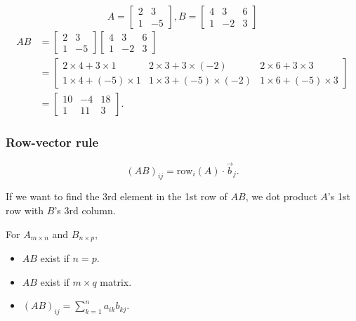 \documentclass{article}
\begin{document}
\begin{example}[Compute AB]
    \[
        A =
        \begin{bmatrix}
            2 & 3 \\
            1 & -5
        \end{bmatrix},
        B =
        \begin{bmatrix}
            4 & 3 & 6 \\
            1 & -2 & 3
        \end{bmatrix}
    \] 
    \begin{align*}
        AB &= 
        \begin{bmatrix}
            2 & 3 \\
            1 & -5
        \end{bmatrix}
        \begin{bmatrix}
            4 & 3 & 6 \\
            1 & -2 & 3
        \end{bmatrix}\\
           &=
        \begin{bmatrix}
            2 \times 4 + 3 \times 1 & 2 \times 3 + 3 \times (-2) & 2 \times 6 + 3 \times 3 \\
            1 \times 4 + (-5) \times 1 & 1 \times 3 + (-5) \times (-2) & 1 \times 6 + (-5) \times 3
        \end{bmatrix}\\
           &=
        \begin{bmatrix}
            10 & -4 & 18 \\
            1 & 11 & 3
        \end{bmatrix}
    .\end{align*}
\end{example}

\subsubsection{Row-vector rule}%
\[
    (AB)_{ij} = \text{row}_{i}(A) \cdot \vec{b}_j
.\] 

\begin{example}
    If we want to find the 3rd element in the 1st row of $AB$, we dot product $A$'s 1st row with $B$'s 3rd column.
\end{example}

\hh

For $A_{m\times n}$ and $B_{n\times p}$,
\begin{itemize}
    \item $AB$ exist if $n = p$.
    \item $AB$ exist if $m\times q$ matrix.
    \item $(AB)_{ij} = \sum_{k=1}^n a_{ik}b_{kj}$.
\end{itemize}
\end{document}
